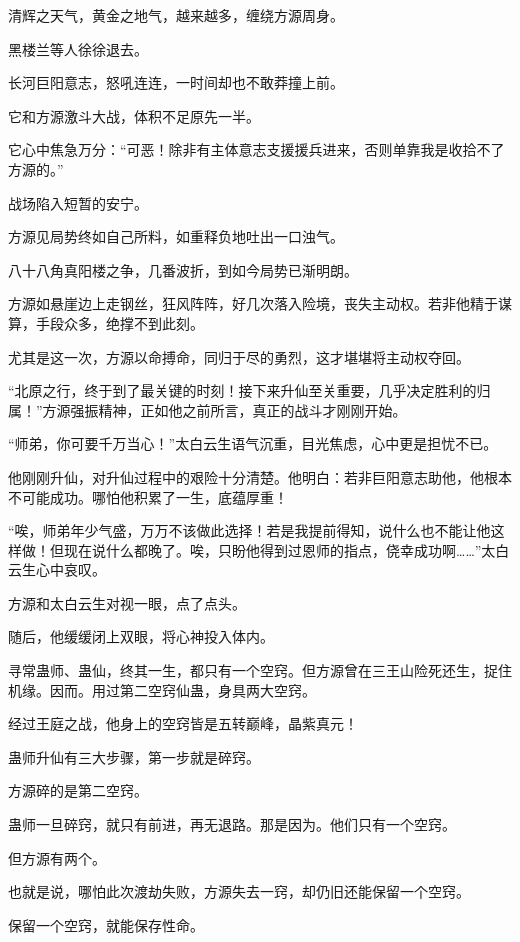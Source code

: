 
\begin{this_body}

清辉之天气，黄金之地气，越来越多，缠绕方源周身。

黑楼兰等人徐徐退去。

长河巨阳意志，怒吼连连，一时间却也不敢莽撞上前。

它和方源激斗大战，体积不足原先一半。

它心中焦急万分：“可恶！除非有主体意志支援援兵进来，否则单靠我是收拾不了方源的。”

战场陷入短暂的安宁。

方源见局势终如自己所料，如重释负地吐出一口浊气。

八十八角真阳楼之争，几番波折，到如今局势已渐明朗。

方源如悬崖边上走钢丝，狂风阵阵，好几次落入险境，丧失主动权。若非他精于谋算，手段众多，绝撑不到此刻。

尤其是这一次，方源以命搏命，同归于尽的勇烈，这才堪堪将主动权夺回。

“北原之行，终于到了最关键的时刻！接下来升仙至关重要，几乎决定胜利的归属！”方源强振精神，正如他之前所言，真正的战斗才刚刚开始。

“师弟，你可要千万当心！”太白云生语气沉重，目光焦虑，心中更是担忧不已。

他刚刚升仙，对升仙过程中的艰险十分清楚。他明白：若非巨阳意志助他，他根本不可能成功。哪怕他积累了一生，底蕴厚重！

“唉，师弟年少气盛，万万不该做此选择！若是我提前得知，说什么也不能让他这样做！但现在说什么都晚了。唉，只盼他得到过恩师的指点，侥幸成功啊……”太白云生心中哀叹。

方源和太白云生对视一眼，点了点头。

随后，他缓缓闭上双眼，将心神投入体内。

寻常蛊师、蛊仙，终其一生，都只有一个空窍。但方源曾在三王山险死还生，捉住机缘。因而。用过第二空窍仙蛊，身具两大空窍。

经过王庭之战，他身上的空窍皆是五转巅峰，晶紫真元！

蛊师升仙有三大步骤，第一步就是碎窍。

方源碎的是第二空窍。

蛊师一旦碎窍，就只有前进，再无退路。那是因为。他们只有一个空窍。

但方源有两个。

也就是说，哪怕此次渡劫失败，方源失去一窍，却仍旧还能保留一个空窍。

保留一个空窍，就能保存性命。


\end{this_body}
